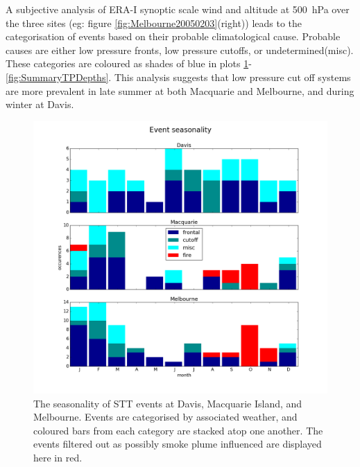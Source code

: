 \documentclass{article}
\begin{document}
  A subjective analysis of ERA-I synoptic scale wind and altitude at 500~hPa over the three sites (eg: figure \ref{fig:Melbourne20050203}(right)) leads to the categorisation of events based on their probable climatological cause.
  Probable causes are either low pressure fronts, low pressure cutoffs, or undetermined(misc).
  These categories are coloured as shades of blue in plots \ref{fig:SummarySeasonality}-\ref{fig:SummaryTPDepths}.
  This analysis suggests that low pressure cut off systems are more prevalent in late summer at both Macquarie and Melbourne, and during winter at Davis.

  \begin{figure}[!htbp]
    \begin{center}
    \includegraphics[width=1.0\columnwidth]{figures/summary_season.png}
    \caption{The seasonality of STT events at Davis, Macquarie Island, and Melbourne.
    Events are categorised by associated weather, and coloured bars from each category are stacked atop one another.
    The events filtered out as possibly smoke plume influenced are displayed here in red.}
    \label{fig:SummarySeasonality}
    \end{center}
  \end{figure}
  
\end{document}
